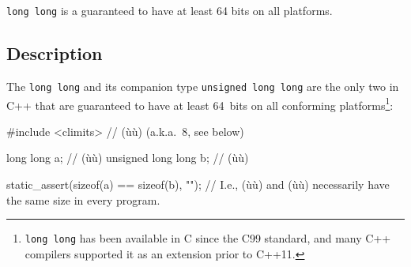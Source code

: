 

\setcounter{table}{0}
\setcounter{footnote}{0}
\setcounter{lstlisting}{0}


\lstinline!long!~\lstinline!long! is a  guaranteed to have at least 64 bits on all
platforms.

\subsection[Description]{Description}\label{description}

The  \lstinline!long!~\lstinline!long! and its companion
type \lstinline!unsigned!~\lstinline!long!~\lstinline!long! are the only two
 in C++ that are guaranteed to have
at least 64~bits on all conforming platforms{\cprotect\footnote{\lstinline!long!~\lstinline!long!
has been available in C since the C99 standard, and many C++ compilers
  supported it as an extension prior to C++11.}}:

\begin{emcppslisting}[language=C++]
#include <climits>  // (ù{}ù) (a.k.a.~8, see below)

long long          a;  // (ù{}ù)
unsigned long long b;  // (ù{}ù)

static_assert(sizeof(a) == sizeof(b), "");
    // I.e., (ù{}ù) and (ù{}ù) necessarily have the same size in every program.
\end{emcppslisting}

